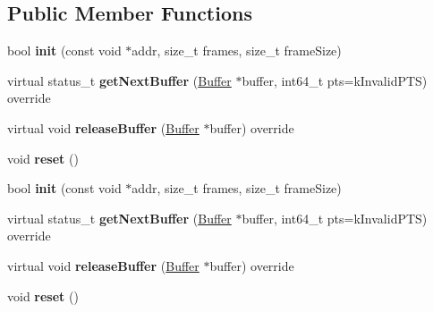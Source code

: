 \subsection*{Public Member Functions}
\begin{DoxyCompactItemize}
\item 
\mbox{\label{classcocos2d_1_1experimental_1_1PcmBufferProvider_a2acf2154fb825c23135a0057a9575d82}} 
bool {\bfseries init} (const void $\ast$addr, size\+\_\+t frames, size\+\_\+t frame\+Size)
\item 
\mbox{\label{classcocos2d_1_1experimental_1_1PcmBufferProvider_af95efcf314365c69101d2ece99415862}} 
virtual status\+\_\+t {\bfseries get\+Next\+Buffer} (\hyperlink{structcocos2d_1_1experimental_1_1AudioBufferProvider_1_1Buffer}{Buffer} $\ast$buffer, int64\+\_\+t pts=k\+Invalid\+P\+TS) override
\item 
\mbox{\label{classcocos2d_1_1experimental_1_1PcmBufferProvider_a785763e428570cb1f01f4b0448018f39}} 
virtual void {\bfseries release\+Buffer} (\hyperlink{structcocos2d_1_1experimental_1_1AudioBufferProvider_1_1Buffer}{Buffer} $\ast$buffer) override
\item 
\mbox{\label{classcocos2d_1_1experimental_1_1PcmBufferProvider_aead41e16db3df55e2ab9c84669d6d845}} 
void {\bfseries reset} ()
\item 
\mbox{\label{classcocos2d_1_1experimental_1_1PcmBufferProvider_a2acf2154fb825c23135a0057a9575d82}} 
bool {\bfseries init} (const void $\ast$addr, size\+\_\+t frames, size\+\_\+t frame\+Size)
\item 
\mbox{\label{classcocos2d_1_1experimental_1_1PcmBufferProvider_a6c2d03592ea6d5cb84371b05962b6b3c}} 
virtual status\+\_\+t {\bfseries get\+Next\+Buffer} (\hyperlink{structcocos2d_1_1experimental_1_1AudioBufferProvider_1_1Buffer}{Buffer} $\ast$buffer, int64\+\_\+t pts=k\+Invalid\+P\+TS) override
\item 
\mbox{\label{classcocos2d_1_1experimental_1_1PcmBufferProvider_ab18f3ee6a319684f72df7e2fb6688600}} 
virtual void {\bfseries release\+Buffer} (\hyperlink{structcocos2d_1_1experimental_1_1AudioBufferProvider_1_1Buffer}{Buffer} $\ast$buffer) override
\item 
\mbox{\label{classcocos2d_1_1experimental_1_1PcmBufferProvider_aead41e16db3df55e2ab9c84669d6d845}} 
void {\bfseries reset} ()
\end{DoxyCompactItemize}
